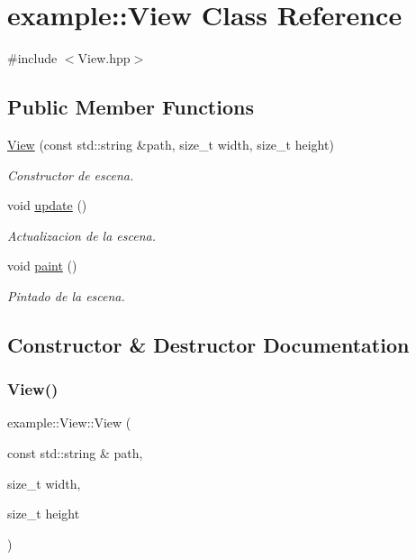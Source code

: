 \hypertarget{classexample_1_1_view}{}\section{example\+::View Class Reference}
\label{classexample_1_1_view}


{\ttfamily \#include $<$View.\+hpp$>$}

\subsection*{Public Member Functions}
\begin{DoxyCompactItemize}
\item 
\mbox{\hyperlink{classexample_1_1_view_a02db79d808b366284585a4f313a8cbbb}{View}} (const std\+::string \&path, size\+\_\+t width, size\+\_\+t height)
\begin{DoxyCompactList}\small\item\em Constructor de escena. \end{DoxyCompactList}\item 
void \mbox{\hyperlink{classexample_1_1_view_a5d7943a77bb6ce297fccd2bbfbda3701}{update}} ()
\begin{DoxyCompactList}\small\item\em Actualizacion de la escena. \end{DoxyCompactList}\item 
void \mbox{\hyperlink{classexample_1_1_view_a1c7ff995d88e64b1cf69a665cd27bd0b}{paint}} ()
\begin{DoxyCompactList}\small\item\em Pintado de la escena. \end{DoxyCompactList}\end{DoxyCompactItemize}


\subsection{Constructor \& Destructor Documentation}
\mbox{\label{classexample_1_1_view_a02db79d808b366284585a4f313a8cbbb}} 
\subsubsection{\texorpdfstring{View()}{View()}}
{\footnotesize\ttfamily example\+::\+View\+::\+View (\begin{DoxyParamCaption}\item[{const std\+::string \&}]{path,  }\item[{size\+\_\+t}]{width,  }\item[{size\+\_\+t}]{height }\end{DoxyParamCaption})}



